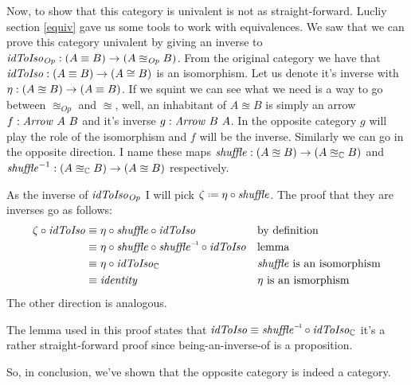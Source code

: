 Now, to show that this category is univalent is not as straight-forward. Lucliy
section \ref{equiv} gave us some tools to work with equivalences. We saw that we
can prove this category univalent by giving an inverse to
$\mathit{idToIso}_{\mathit{Op}} \;\mathord{:}\; (A \equiv B) \to (A \approxeq_{\mathit{Op}} B)$.
From the original category we have that $\mathit{idToIso} \;\mathord{:}\; (A \equiv B) \to (A \cong
B)$ is an isomorphism. Let us denote it's inverse with $\eta \;\mathord{:}\; (A \approxeq B)
\to (A \equiv B)$. If we squint we can see what we need is a way to go between
$\approxeq_{\mathit{Op}}$ and $\approxeq$, well, an inhabitant of $A \approxeq
B$ is simply an arrow $f \;\mathord{:}\; \mathit{Arrow}\ A\ B$ and it's inverse $g \;\mathord{:}\;
\mathit{Arrow}\ B\ A$. In the opposite category $g$ will play the role of the
isomorphism and $f$ will be the inverse. Similarly we can go in the opposite
direction. I name these maps $\mathit{shuffle} \;\mathord{:}\; (A \approxeq B) \to (A
\approxeq_{\mathbb{C}} B)$ and $\mathit{shuffle}^{-1} : (A \approxeq_{\mathbb{C}} B) \to (A
\approxeq B)$ respectively.

As the inverse of $\mathit{idToIso}_{\mathit{Op}}$ I will pick $\zeta \defeq \eta \comp
\mathit{shuffle}$. The proof that they are inverses go as follows:
%
\begin{align*}
\zeta \comp \idToIso & \equiv
\eta \comp \shuffle \comp \idToIso
&& \text{by definition} \\
%
& \equiv
\eta \comp \shuffle \comp \inv{\shuffle} \comp \idToIso
&& \text{lemma} \\
& \equiv
\eta \comp \idToIso_{\bC}
&& \text{$\shuffle$ is an isomorphism} \\
& \equiv
\identity
&& \text{$\eta$ is an ismorphism}
\end{align*}
%
The other direction is analogous.

The lemma used in this proof states that $\idToIso \equiv \inv{\shuffle} \comp
\idToIso_{\bC}$ it's a rather straight-forward proof since being-an-inverse-of
is a proposition.

So, in conclusion, we've shown that the opposite category is indeed a category.


